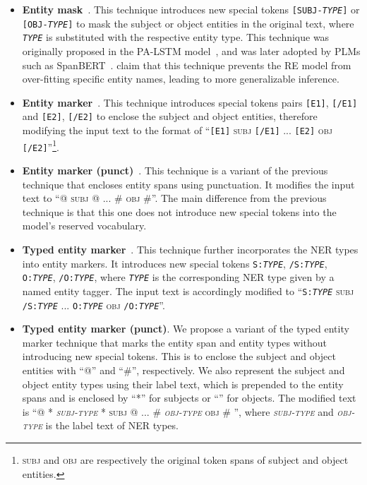\documentclass[11pt,a4paper]{article}
\begin{document}
\begin{itemize}[leftmargin=1em]
    \setlength\itemsep{0em}

    \item \textbf{Entity mask}~\cite{zhang-etal-2017-position}. This technique introduces new special tokens \texttt{[SUBJ-\emph{TYPE}]} or \texttt{[OBJ-\emph{TYPE}]} to mask the subject or object entities in the original text, where \texttt{\emph{TYPE}} is substituted with the respective entity type.
    This technique was originally proposed in the PA-LSTM model~\cite{zhang-etal-2017-position}, and was later adopted by PLMs such as SpanBERT~\cite{joshi-etal-2020-spanbert}.
    \citet{zhang-etal-2017-position} claim that this technique prevents the RE model from over-fitting specific entity names, leading to more generalizable inference.

    \item \textbf{Entity marker}~\cite{zhang-etal-2019-ernie,baldini-soares-etal-2019-matching}. This technique introduces special tokens pairs \texttt{[E1]}, \texttt{[/E1]} and \texttt{[E2]}, \texttt{[/E2]} to enclose the subject and object entities, therefore modifying the input text to the format of ``\texttt{[E1]} \textsc{subj} \texttt{[/E1]} ... \texttt{[E2]} \textsc{obj} \texttt{[/E2]}''\footnote{\textsc{subj} and \textsc{obj} are respectively the original token spans of subject and object entities.}.

    \item \textbf{Entity marker (punct)}~\cite{wang2020k,zhou2021atlop}. This technique is a variant of the previous technique that encloses entity spans using punctuation.
    It modifies the input text to ``@ \textsc{subj} @ ... \# \textsc{obj} \#''. The main difference from the previous technique is that this one does not introduce new special tokens into the model's reserved vocabulary.

    \item \textbf{Typed entity marker}~\cite{zhong2020frustratingly}. This technique further incorporates the NER types into entity markers.
    It introduces new special tokens \texttt{S:\emph{TYPE}}, \texttt{/S:\emph{TYPE}}, \texttt{O:\emph{TYPE}}, \texttt{/O:\emph{TYPE}}, where \texttt{\emph{TYPE}} is the corresponding NER type given by a named entity tagger. The input text is accordingly modified to ``\texttt{S:\emph{TYPE}} \textsc{subj} \texttt{/S:\emph{TYPE}} ... \texttt{O:\emph{TYPE}} \textsc{obj} \texttt{/O:\emph{TYPE}}''.

    \item \textbf{Typed entity marker (punct)}. We propose a variant of the typed entity marker technique that marks the entity span and entity types without introducing new special tokens.
    This is to enclose the subject and object entities with ``@'' and ``\#'', respectively.
    We also represent the subject and object entity types using their label text, which is prepended to the entity spans and is enclosed by ``*'' for subjects or ``'' for objects.
    The modified text is ``@ * \textsc{\textit{subj-type}} * \textsc{subj} @ ... \#  \textsc{\textit{obj-type}}  \textsc{obj} \# '', where \textsc{\textit{subj-type}} and \textsc{\textit{obj-type}} is the label text of NER types.
\end{itemize}
\end{document}
